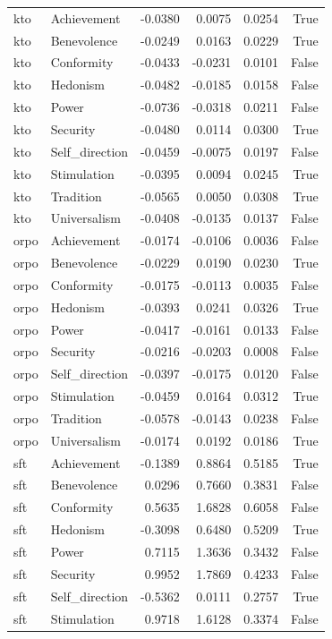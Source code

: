 \begin{tabular}{llrrrr}
kto & Achievement & -0.0380 & 0.0075 & 0.0254 & True \\
kto & Benevolence & -0.0249 & 0.0163 & 0.0229 & True \\
kto & Conformity & -0.0433 & -0.0231 & 0.0101 & False \\
kto & Hedonism & -0.0482 & -0.0185 & 0.0158 & False \\
kto & Power & -0.0736 & -0.0318 & 0.0211 & False \\
kto & Security & -0.0480 & 0.0114 & 0.0300 & True \\
kto & Self\_direction & -0.0459 & -0.0075 & 0.0197 & False \\
kto & Stimulation & -0.0395 & 0.0094 & 0.0245 & True \\
kto & Tradition & -0.0565 & 0.0050 & 0.0308 & True \\
kto & Universalism & -0.0408 & -0.0135 & 0.0137 & False \\
orpo & Achievement & -0.0174 & -0.0106 & 0.0036 & False \\
orpo & Benevolence & -0.0229 & 0.0190 & 0.0230 & True \\
orpo & Conformity & -0.0175 & -0.0113 & 0.0035 & False \\
orpo & Hedonism & -0.0393 & 0.0241 & 0.0326 & True \\
orpo & Power & -0.0417 & -0.0161 & 0.0133 & False \\
orpo & Security & -0.0216 & -0.0203 & 0.0008 & False \\
orpo & Self\_direction & -0.0397 & -0.0175 & 0.0120 & False \\
orpo & Stimulation & -0.0459 & 0.0164 & 0.0312 & True \\
orpo & Tradition & -0.0578 & -0.0143 & 0.0238 & False \\
orpo & Universalism & -0.0174 & 0.0192 & 0.0186 & True \\
sft & Achievement & -0.1389 & 0.8864 & 0.5185 & True \\
sft & Benevolence & 0.0296 & 0.7660 & 0.3831 & False \\
sft & Conformity & 0.5635 & 1.6828 & 0.6058 & False \\
sft & Hedonism & -0.3098 & 0.6480 & 0.5209 & True \\
sft & Power & 0.7115 & 1.3636 & 0.3432 & False \\
sft & Security & 0.9952 & 1.7869 & 0.4233 & False \\
sft & Self\_direction & -0.5362 & 0.0111 & 0.2757 & True \\
sft & Stimulation & 0.9718 & 1.6128 & 0.3374 & False \\

\end{tabular}
